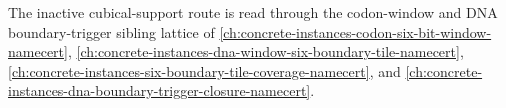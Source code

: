 \noindent The inactive cubical-support route is read through the codon-window and DNA boundary-trigger sibling lattice of \autoref{ch:concrete-instances-codon-six-bit-window-namecert}, \autoref{ch:concrete-instances-dna-window-six-boundary-tile-namecert}, \autoref{ch:concrete-instances-six-boundary-tile-coverage-namecert}, and \autoref{ch:concrete-instances-dna-boundary-trigger-closure-namecert}.

